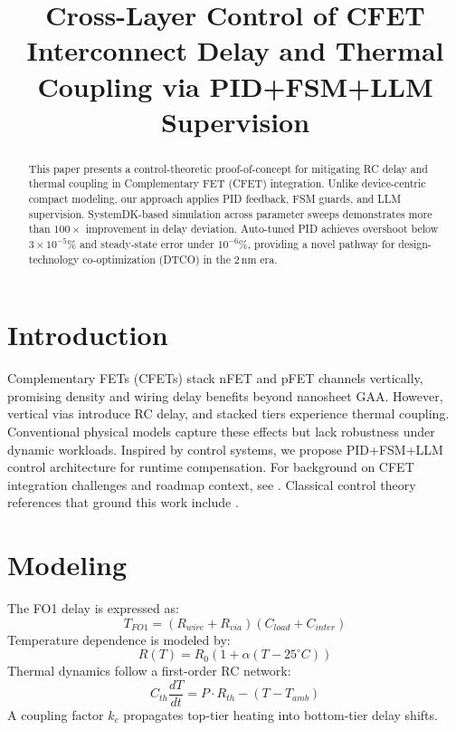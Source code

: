 \documentclass[conference]{IEEEtran}
\title{Cross-Layer Control of CFET Interconnect Delay and Thermal Coupling via PID+FSM+LLM Supervision}
\author{
  \IEEEauthorblockN{Shinichi Samizo}
  \IEEEauthorblockA{Independent Semiconductor Researcher\\
  Email: \href{mailto:shin3t72@gmail.com}{shin3t72@gmail.com}}
}
\begin{document}
\maketitle

\begin{abstract}
This paper presents a control-theoretic proof-of-concept
for mitigating RC delay and thermal coupling in Complementary FET (CFET) integration.
Unlike device-centric compact modeling, our approach applies PID feedback, FSM guards,
and LLM supervision. SystemDK-based simulation across parameter sweeps demonstrates
more than $100\times$ improvement in delay deviation. Auto-tuned PID achieves overshoot
below $3\times 10^{-5}\%$ and steady-state error under $10^{-6}\%$, providing a novel pathway
for design-technology co-optimization (DTCO) in the 2\,nm era.
\end{abstract}

\section{Introduction}
Complementary FETs (CFETs) stack nFET and pFET channels vertically,
promising density and wiring delay benefits beyond nanosheet GAA.
However, vertical vias introduce RC delay, and stacked tiers experience
thermal coupling. Conventional physical models capture these effects
but lack robustness under dynamic workloads. Inspired by control systems,
we propose PID+FSM+LLM control architecture for runtime compensation.
For background on CFET integration challenges and roadmap context, see \cite{yakimets2020cfet,irds2023}.
Classical control theory references that ground this work include \cite{franklin2015,khalil2002,anderson2007optimal}.

\section{Modeling}
The FO1 delay is expressed as:
\begin{equation}
T_{FO1} = (R_{wire}+R_{via})(C_{load}+C_{inter})
\end{equation}
Temperature dependence is modeled by:
\begin{equation}
R(T) = R_0 \left(1 + \alpha (T-25^\circ C)\right)
\end{equation}
Thermal dynamics follow a first-order RC network:
\begin{equation}
C_{th}\frac{dT}{dt} = P\cdot R_{th} - (T - T_{amb})
\end{equation}
A coupling factor $k_c$ propagates top-tier heating into bottom-tier delay shifts.
\end{document}
